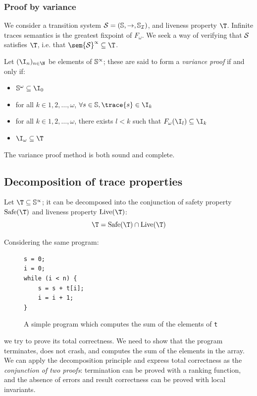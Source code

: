 \documentclass[toc, titlepaged]{../cs-classes/cs-classes}
\DeclareMathOperator{\safe}{Safe}
\DeclareMathOperator{\live}{Live}
\begin{document}
\subsubsection{Proof by variance}
We consider a transition system $\Sc = (\S, \to, \S_{\mathcal{I}})$, and liveness property $\T$. Infinite traces semantics is the greatest fixpoint of $F_\omega$. We seek a way of verifying that $\Sc$ satisfies $\T$, i.e. that $\sem{\Sc}^\propto \subseteq \T$.

\begin{definition}
    Let $(\I_n)_{n\in\N}$ be elements of $\S^\propto$; these are said to form a \emph{variance proof} if and only if:
    \begin{itemize}
        \item $\S^\omega\subseteq\I_0$
        \item for all $k\in{1, 2, \dots, \omega}$, $\forall s\in\S, \trace{s}\in\I_k$
        \item for all $k\in{1, 2, \dots, \omega}$, there exists $l<k$ such that $F_\omega(\I_l)\subseteq\I_k$
        \item $\I_\omega\subseteq\T$
    \end{itemize}
\end{definition}

\begin{theorem}
    The variance proof method is both sound and complete.
\end{theorem}

\subsection{Decomposition of trace properties}
\begin{theorem}
    Let $\T\subseteq \S^\propto$; it can be decomposed into the conjunction of safety property $\safe(\T)$ and liveness property $\live(\T)$:
    \begin{equation*}
        \T = \safe(\T) \cap \live(\T)
    \end{equation*}
\end{theorem}

\begin{example}
    Considering the same program:
    \begin{figure}[!ht]
        \centering 
        \begin{minipage}{0.2\textwidth}
            \begin{verbatim}
s = 0;
i = 0;
while (i < n) {
    s = s + t[i];
    i = i + 1;
}
            \end{verbatim}
        \end{minipage}
        \caption{A simple program which computes the sum of the elements of \texttt{t}}
    \end{figure}
    we try to prove its total correctness. We need to show that the program terminates, does not crash, and computes the sum of the elements in the array. We can apply the decomposition principle and express total correctness as the \emph{conjunction of two proofs}: termination can be proved with a ranking function, and the absence of errors and result correctness can be proved with local invariants.
\end{example}
\end{document}
